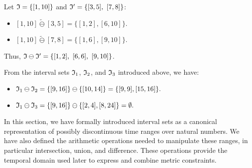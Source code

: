 \begin{example} Let $\mathfrak{I} = \{ [1, 10] \}$ and $\mathfrak{I}' = \{ [3, 5],\ [7, 8] \}$:

\begin{itemize}
    \item $[1, 10] \widetilde{\ominus} [3, 5]= \{[1,2], [6,10]\}$.
    \item $[1, 10] \widetilde{\ominus} [7, 8]= \{[1,6], [9,10]\}$.
\end{itemize}
\end{example}

Thus, $\mathfrak{I} \ominus \mathfrak{I}' = \{ [1, 2],\ [6, 6],\ [9, 10] \}$.

From the interval sets $\mathfrak{I}_1$, $\mathfrak{I}_2$, and $\mathfrak{I}_3$ introduced above, we have:
\begin{itemize}
    \item $\mathfrak{I}_1 \ominus \mathfrak{I}_2= \{[9,16]\} \ominus \{[10,14]\}= \{[9,9],[15,16]\}.$
    \item $\mathfrak{I}_1 \ominus \mathfrak{I}_3 = \{[9,16]\} \ominus \{[2,4],[8, 24]\}= \emptyset. $
\end{itemize}

In this section, we have formally introduced interval sets as a canonical representation of possibly discontinuous time ranges over natural numbers. We have also defined the arithmetic operations needed to manipulate these ranges, in particular intersection, union, and difference. These operations provide the temporal domain used later to express and combine metric constraints.


